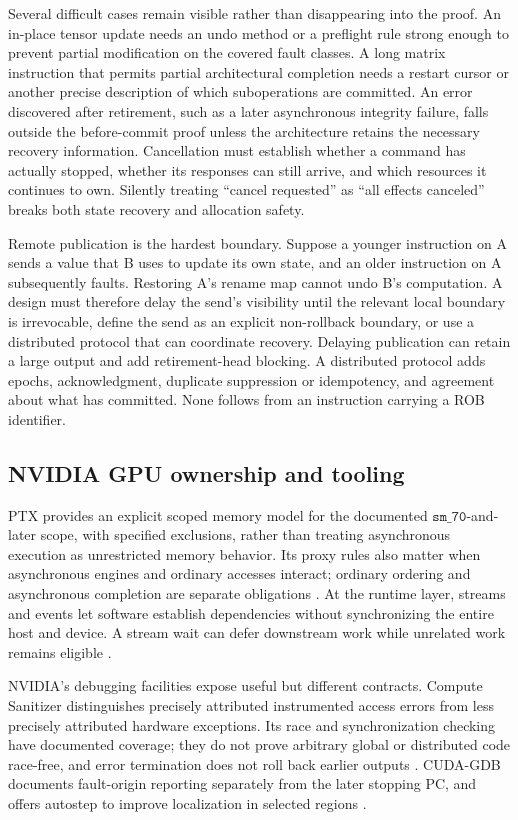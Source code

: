 Several difficult cases remain visible rather than disappearing into the proof. An in-place tensor update needs an undo method or a preflight rule strong enough to prevent partial modification on the covered fault classes. A long matrix instruction that permits partial architectural completion needs a restart cursor or another precise description of which suboperations are committed. An error discovered after retirement, such as a later asynchronous integrity failure, falls outside the before-commit proof unless the architecture retains the necessary recovery information. Cancellation must establish whether a command has actually stopped, whether its responses can still arrive, and which resources it continues to own. Silently treating ``cancel requested'' as ``all effects canceled'' breaks both state recovery and allocation safety.

Remote publication is the hardest boundary. Suppose a younger instruction on A sends a value that B uses to update its own state, and an older instruction on A subsequently faults. Restoring A's rename map cannot undo B's computation. A design must therefore delay the send's visibility until the relevant local boundary is irrevocable, define the send as an explicit non-rollback boundary, or use a distributed protocol that can coordinate recovery. Delaying publication can retain a large output and add retirement-head blocking. A distributed protocol adds epochs, acknowledgment, duplicate suppression or idempotency, and agreement about what has committed. None follows from an instruction carrying a ROB identifier.

\subsection{NVIDIA GPU ownership and tooling}

PTX provides an explicit scoped memory model for the documented $\texttt{sm\_70}$-and-later scope, with specified exclusions, rather than treating asynchronous execution as unrestricted memory behavior. Its proxy rules also matter when asynchronous engines and ordinary accesses interact; ordinary ordering and asynchronous completion are separate obligations \citep{u007_ptx}. At the runtime layer, streams and events let software establish dependencies without synchronizing the entire host and device. A stream wait can defer downstream work while unrelated work remains eligible \citep{u007_cuda_async}.

NVIDIA's debugging facilities expose useful but different contracts. Compute Sanitizer distinguishes precisely attributed instrumented access errors from less precisely attributed hardware exceptions. Its race and synchronization checking have documented coverage; they do not prove arbitrary global or distributed code race-free, and error termination does not roll back earlier outputs \citep{u007_compute_sanitizer}. CUDA-GDB documents fault-origin reporting separately from the later stopping PC, and offers autostep to improve localization in selected regions \citep{u007_cuda_gdb}.

